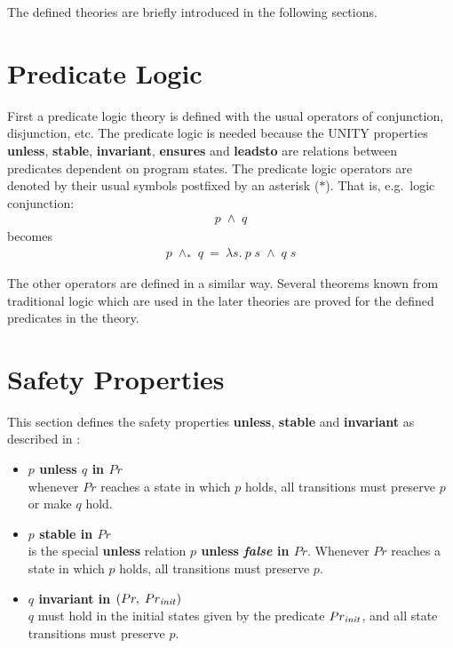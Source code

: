 \bigskip
The defined theories are briefly introduced in the following sections.

\section{Predicate Logic}

First a predicate logic theory is defined with the usual operators of
conjunction, disjunction, etc. The predicate logic is needed because the UNITY
properties {\bf unless}, {\bf stable}, {\bf invariant}, {\bf ensures} and {\bf
leadsto} are relations between predicates dependent on program states.  The
predicate logic operators are denoted by their usual symbols postfixed by an
asterisk ($*$). That is, e.g.\ logic conjunction:
\begin{eqnarray*}
p\; \wedge\; q
\end{eqnarray*}
becomes
\begin{eqnarray*}
p\; \wedge_*\; q\ =\ \lambda s.\ p\; s\; \wedge\; q\; s
\end{eqnarray*}

The other operators are defined in a similar way.  Several theorems known from
traditional logic which are used in the later theories are proved for the
defined predicates in the theory.

\section{Safety Properties}

This section defines the safety properties {\bf unless}, {\bf stable} and
{\bf invariant} as described in \cite{CM88}:

\begin{itemize}
  \item {\bf $p$ unless $q$ in $Pr$} \ \\
    whenever $Pr$ reaches a state in which $p$ holds, all transitions must
    preserve $p$ or make $q$ hold.

  \item {\bf $p$ stable in $Pr$} \ \\
    is the special {\bf unless} relation {\bf $p$ unless {\it false} in $Pr$}.
    Whenever $Pr$ reaches a state in which $p$ holds, all transitions must
    preserve $p$.

  \item {\bf $q$ invariant in $(Pr,\;Pr_{\it init})$} \ \\  
    $q$ must hold in the initial states given by the predicate $Pr_{\it init}$,
    and all state transitions must preserve $p$.
\end{itemize}

